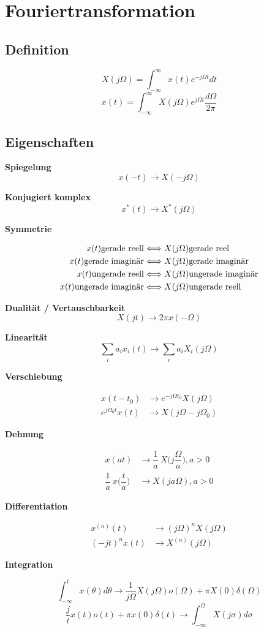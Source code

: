 \documentclass[10pt,a4paper]{article}
\newcommand{\fancyformula}[2]{
	\small
	\raggedright\sffamily\textbf{#1}
	#2
}
\begin{document}
\newpage

\section*{Fouriertransformation}
\subsection*{Definition}
\begin{multicols}{2}
		\[ X(j\Omega)=\int_{-\infty}^{\infty}x(t)e^{-j\Omega t}dt \]
		\[ x(t)=\int_{-\infty}^{\infty}X(j\Omega)e^{j\Omega t} \dfrac{d\Omega}{2\pi} \]
\end{multicols}
\subsection*{Eigenschaften}
\begin{multicols}{2}

\fancyformula{Spiegelung}{\[ x(-t)\longrightarrow X(-j\Omega) \]}
\fancyformula{Konjugiert komplex}{\[ x^*(t) \longrightarrow X^*(j\Omega)\]}
\fancyformula{Symmetrie}{
\begin{align*}
	x(t) \textnormal{gerade reell} &\Longleftrightarrow X(j\Omega) \textnormal{gerade reel} \\
	x(t) \textnormal{gerade imaginär} &\Longleftrightarrow X(j\Omega) \textnormal{gerade imaginär} \\
	x(t) \textnormal{ungerade reell} &\Longleftrightarrow X(j\Omega) \textnormal{ungerade imaginär} \\
	x(t) \textnormal{ungerade imaginär} &\Longleftrightarrow X(j\Omega) \textnormal{ungerade reell} \\
\end{align*}
}
\fancyformula{Dualität / Vertauschbarkeit}{\[ X(jt)\longrightarrow 2\pi x(-\Omega) \]}
\fancyformula{Linearität}{\[ \sum_{i} a_i x_i(t) \longrightarrow \sum_{i} a_i X_i(j\Omega)\]}
\fancyformula{Verschiebung}{
\begin{align*}
	x(t-t_0) &\longrightarrow e^{-j\Omega t_0}X(j\Omega) \\
	e^{j\Omega_0t}x(t) &\longrightarrow X(j\Omega-j\Omega_0)
\end{align*}
}
\fancyformula{Dehnung}{
	\begin{align*}
	x(at) &\longrightarrow \dfrac{1}{a}~X\bigg(j\dfrac{\Omega}{a}\bigg), a>0 \\
	\dfrac{1}{a}~x\bigg(\dfrac{t}{a}\bigg) &\longrightarrow X(ja\Omega), a>0
	\end{align*}
}
\fancyformula{Differentiation}{
\begin{align*}
	x^{(n)}(t) &\longrightarrow (j\Omega)^nX(j\Omega) \\
	(-jt)^nx(t) &\longrightarrow X^{(n)}(j\Omega)
\end{align*}	
}
\fancyformula{Integration}{
	\[\int_{-\infty}^{t}x(\theta)d\theta \longrightarrow \dfrac{1}{j\Omega} X(j\Omega) o(\Omega)+\pi X(0)\delta(\Omega)\]
	\[\dfrac{j}{t}x(t)o(t)+\pi x(0) \delta(t)  \longrightarrow \int_{-\infty}^{\Omega}X(j\sigma)d\sigma \]
}

\end{multicols}
\end{document}
